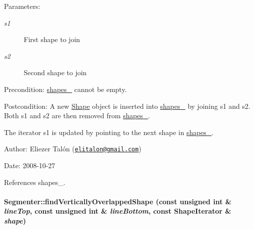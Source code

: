 \begin{Desc}
\item[Parameters:]
\begin{description}
\item[{\em s1}]First shape to join \item[{\em s2}]Second shape to join\end{description}
\end{Desc}
\begin{Desc}
\item[Precondition:]\hyperlink{class_segmenter_41b94ede2829063e0937dc150756e77e}{shapes\_\-} cannot be empty.\end{Desc}
\begin{Desc}
\item[Postcondition:]A new \hyperlink{class_shape}{Shape} object is inserted into \hyperlink{class_segmenter_41b94ede2829063e0937dc150756e77e}{shapes\_\-} by joining s1 and s2. Both s1 and s2 are then removed from \hyperlink{class_segmenter_41b94ede2829063e0937dc150756e77e}{shapes\_\-}. 

The iterator s1 is updated by pointing to the next shape in \hyperlink{class_segmenter_41b94ede2829063e0937dc150756e77e}{shapes\_\-}.\end{Desc}
\begin{Desc}
\item[Author:]Eliezer Talón (\href{mailto:elitalon@gmail.com}{\tt elitalon@gmail.com}) \end{Desc}
\begin{Desc}
\item[Date:]2008-10-27 \end{Desc}


References shapes\_\-.\hypertarget{class_segmenter_dc1e127fcaa1084a990648b7f4ec1461}{
\paragraph[findVerticallyOverlappedShape]{ Segmenter::findVerticallyOverlappedShape (const unsigned int \& {\em lineTop}, \/  const unsigned int \& {\em lineBottom}, \/  const {\bf ShapeIterator} \& {\em shape})}\hfill}
\label{class_segmenter_dc1e127fcaa1084a990648b7f4ec1461}


